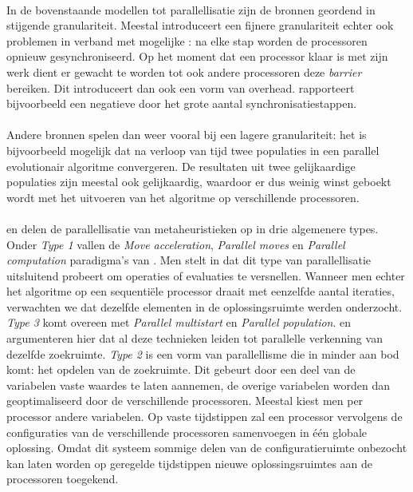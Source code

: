 \paragraph{}
In de bovenstaande modellen tot parallellisatie zijn de bronnen geordend in stijgende granulariteit. Meestal introduceert een fijnere granulariteit echter ook problemen in verband met mogelijke \absu{}: na elke stap worden de processoren opnieuw gesynchroniseerd. Op het moment dat een processor klaar is met zijn werk dient er gewacht te worden tot ook andere processoren deze \emph{barrier} bereiken. Dit introduceert dan ook een vorm van overhead. \cite{conf/glvlsi/HaldarNCB00} rapporteert bijvoorbeeld een negatieve \absu{} door het grote aantal synchronisatiestappen.

\paragraph{}
Andere bronnen spelen dan weer vooral bij een lagere granulariteit: het is bijvoorbeeld mogelijk dat na verloop van tijd twee populaties in een parallel evolutionair algoritme convergeren. De resultaten uit twee gelijkaardige populaties zijn meestal ook gelijkaardig, waardoor er dus weinig winst geboekt wordt met het uitvoeren van het algoritme op verschillende processoren.

\paragraph{}
 en \cite{crainicAndToulouse} delen de parallellisatie van metaheuristieken op in drie algemenere types. Onder \emph{Type 1} vallen de \emph{Move acceleration}, \emph{Parallel moves} en \emph{Parallel computation} paradigma's van . Men stelt in\cite{crainicAndToulouse} dat dit type van parallellisatie uitsluitend probeert om operaties of evaluaties te versnellen. Wanneer men echter het algoritme op een sequenti\"ele processor draait met eenzelfde aantal iteraties, verwachten we dat dezelfde elementen in de oplossingsruimte werden onderzocht. \emph{Type 3} komt overeen met \emph{Parallel multistart} en \emph{Parallel population}.  en  argumenteren hier dat al deze technieken leiden tot parallelle verkenning van dezelfde zoekruimte. \emph{Type 2} is een vorm van parallellisme die in  minder aan bod komt: het opdelen van de zoekruimte. Dit gebeurt door een deel van de variabelen vaste waardes te laten aannemen, de overige variabelen worden dan geoptimaliseerd door de verschillende processoren. Meestal kiest men per processor andere variabelen. Op vaste tijdstippen zal een processor vervolgens de configuraties van de verschillende processoren samenvoegen in \'e\'en globale oplossing. Omdat dit systeem sommige delen van de configuratieruimte onbezocht kan laten worden op geregelde tijdstippen nieuwe oplossingsruimtes aan de processoren toegekend.

